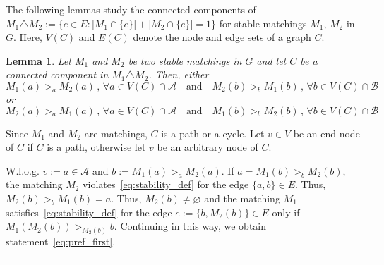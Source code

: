 \documentclass[preprint]{elsarticle}
\newtheorem{lemma}[fact]{Lemma}
\newenvironment{proof}{{\bf Proof:  }}{\hfill\rule{2mm}{2mm}}
\begin{document}
The following lemmas study the connected components of $M_1\triangle M_2:=\{ e\in E: |M_1\cap \{e\}|+|M_2\cap \{e\}|=1\}$ for stable matchings $M_1$, $M_2$ in $G$. Here, $V(C)$ and $E(C)$ denote the node and edge sets of a graph $C$.

\begin{lemma}\label{lemma:pref}
Let $M_1$ and $M_2$ be two stable matchings in $G$ and let $C$ be a connected component in $M_1 \triangle M_2$. Then, either
\begin{equation}\label{eq:pref_first}
	M_1(a)>_a M_2(a)\,,\,\forall a\in V(C) \cap\mathcal{A}\quad \text{and} \quad  M_2(b)>_b M_1(b)\,,\,  \forall b\in V(C) \cap\mathcal{B}
\end{equation}
or 
\begin{equation}\label{eq:pref_second}
	M_2(a)>_a M_1(a)\,,\,\forall a\in V(C) \cap\mathcal{A}\quad \text{and} \quad  M_1(b)>_b M_2(b)\,,\,  \forall b\in V(C) \cap\mathcal{B}
\end{equation}
\end{lemma}


\begin{proof}
Since $M_1$ and $M_2$ are matchings, $C$ is a path or a cycle. Let $v\in V$ be an end node of $C$ if $C$ is a path, otherwise let $v$ be an arbitrary node of $C$. 

W.l.o.g. $v:=a\in \mathcal{A}$ and $b:=M_1(a) >_a M_2(a)$. If $a=M_1(b) >_b M_2(b)$, the matching $M_2$ violates~\eqref{eq:stability_def} for the edge $\{a,b\}\in E$. Thus, $M_2(b) >_b M_1(b)=a$. Thus, $M_2(b)\neq \varnothing$ and the matching $M_1$ satisfies~\eqref{eq:stability_def} for the edge $e:=\{b,M_2(b)\}\in E$ only if $M_1(M_2(b))>_{M_2(b)} b$. Continuing in this way, we obtain statement~\eqref{eq:pref_first}.
\end{proof}
\end{document}
